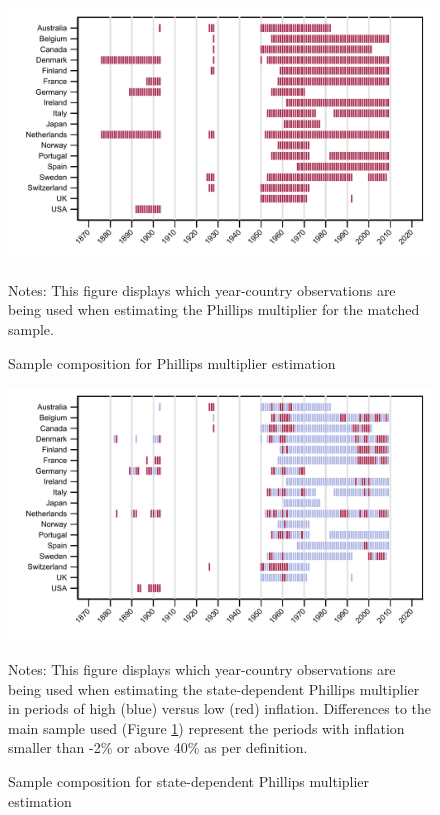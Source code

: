 \documentclass[12pt]{article}
\newcommand{\annote}[1]{\parbox{\textwidth}{\renewcommand{\baselinestretch}{1.0}\vspace{12pt} \footnotesize Notes: #1}}
\begin{document}
\begin{appendices}
\begin{singlespace}
\begin{figure}[h!]
    \centering
    \caption{Sample composition for Phillips multiplier estimation}
    \includegraphics[scale=0.55]{../Output/Figures/Figure_A6}
    \annote{\footnotesize This figure displays which year-country observations are being used when estimating the Phillips multiplier for the matched sample.}
    \label{F:Sample}
\end{figure}

\begin{figure}[h!]
    \centering
    \caption{Sample composition for state-dependent Phillips multiplier estimation}
    \includegraphics[scale=0.55]{../Output/Figures/Figure_A7}
    \annote{\footnotesize This figure displays which year-country observations are being used when estimating the state-dependent Phillips multiplier in periods of high (blue) versus low (red) inflation. Differences to the main sample used (Figure \ref{F:Sample}) represent the periods with inflation smaller than -2\% or above 40\% as per definition.}
    \label{F:Sample_SD}
\end{figure}



\end{singlespace}
\end{appendices}
\end{document}
